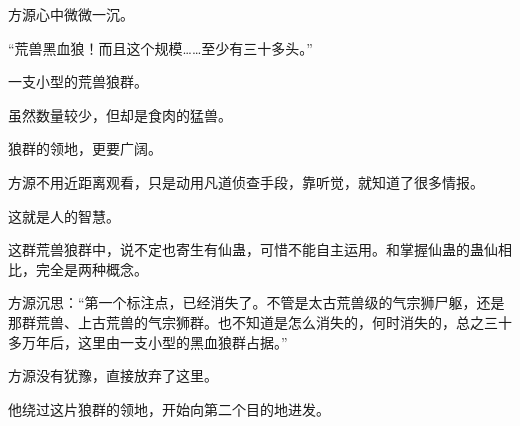 \begin{this_body}
方源心中微微一沉。

“荒兽黑血狼！而且这个规模……至少有三十多头。”

一支小型的荒兽狼群。

虽然数量较少，但却是食肉的猛兽。

狼群的领地，更要广阔。

方源不用近距离观看，只是动用凡道侦查手段，靠听觉，就知道了很多情报。

这就是人的智慧。

这群荒兽狼群中，说不定也寄生有仙蛊，可惜不能自主运用。和掌握仙蛊的蛊仙相比，完全是两种概念。

方源沉思：“第一个标注点，已经消失了。不管是太古荒兽级的气宗狮尸躯，还是那群荒兽、上古荒兽的气宗狮群。也不知道是怎么消失的，何时消失的，总之三十多万年后，这里由一支小型的黑血狼群占据。”

方源没有犹豫，直接放弃了这里。

他绕过这片狼群的领地，开始向第二个目的地进发。

\end{this_body}

